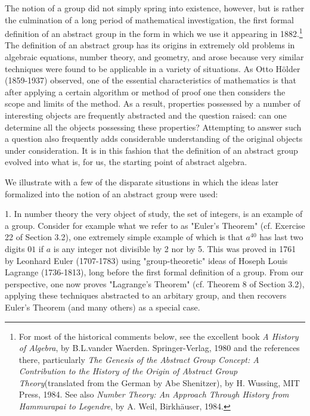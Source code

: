 \documentclass[cn,11pt,chinese]{elegantbook}
\numberwithin{equation}{section}
\begin{document}
The notion of a group did not simply spring into existence, however, but is rather the culmination of a long period of mathematical investigation, the first formal definition of an abstract group in the form in which we use it appearing in 1882.\footnote{For most of the historical comments below, see the excellent book \emph{A History of Algebra}, by B.L.vander Waerden. Springer-Verlag, 1980 and the references there, particularly \emph{The Genesis of the Abstract Group Concept: A Contribution to the History of the Origin of Abstract Group Theory}(translated from the German by Abe Shenitzer), by H. Wussing, MIT Press, 1984. See also \emph{Number Theory: An Approach Through History from Hammurapai to Legendre}, by A. Weil, Birkh\"auser, 1984.} The definition of an abstract group has its origins in extremely old problems in algebraic equations, number theory, and geometry, and arose because very similar techniques were found to be applicable in a variety of situations. As Otto H\"older (1859-1937) observed, one of the essential characteristics of mathematics is that after applying a certain algorithm or method of proof one then considers the scope and limits of the method. As a result, properties possessed by a number of interesting objects are frequently abstracted and the question raised: can one determine all the objects possessing these properties? Attempting to answer such a question also frequently adds considerable understanding of the original objects under consideration. It is in this fashion that the definition of an abstract group evolved into what is, for us, the starting point of abstract algebra.

We illustrate with a few of the disparate situstions in which the ideas later formalized into the notion of an abstract group were used:

1. In number theory the very object of study, the set of integers, is an example of a group. Consider for example what we refer to as "Euler's Theorem" (cf. Exercise 22 of Section 3.2), one extremely simple example of which is that $a^{40}$ has last two digits $01$ if $a$ is any integer not divisible by 2 nor by 5. This was proved in 1761 by Leonhard Euler (1707-1783) using "group-theoretic" ideas of Hoseph Louis Lagrange (1736-1813), long before the first formal definition of a group. From our perspective, one now proves "Lagrange's Theorem" (cf. Theorem 8 of Section 3.2), applying these techniques abstracted to an arbitary group, and then recovers Euler's Theorem (and many others) as a special case.
\end{document}
